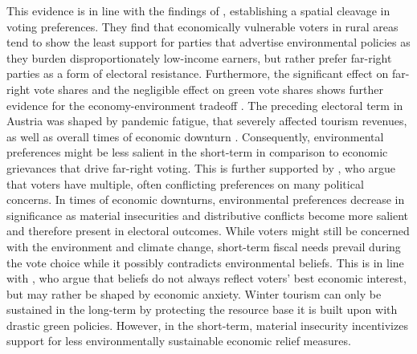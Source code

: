 \documentclass{article}
\begin{document}
This evidence is in line with the findings of \textcite{Halikiopoulou_Vrakopoulos_Arndt_2026}, establishing a spatial cleavage in voting preferences. They find that economically vulnerable voters in rural areas tend to show the least support for parties that advertise  environmental policies as they burden disproportionately low-income earners, but rather prefer far-right parties as a form of electoral resistance. Furthermore, the significant effect on far-right vote shares and the negligible effect on green vote shares shows further evidence for the economy-environment tradeoff \parencite{Shum2012, Mildenberger2017}. The preceding electoral term in Austria was shaped by pandemic fatigue, that severely affected tourism revenues, as well as overall times of economic downturn \parencite{Praprotnik2025}. Consequently,  environmental preferences might be less salient in the short-term in comparison to economic grievances that drive far-right voting. This is further supported by \textcite{Zaller1992}, who argue that voters have multiple, often conflicting preferences on many political concerns. In times of economic downturns, environmental preferences decrease in significance as material insecurities and distributive conflicts become more salient and therefore present in electoral outcomes. While voters might still be concerned with the environment and climate change, short-term fiscal needs prevail during the vote choice while it possibly contradicts environmental beliefs. This is in line with \textcite{Rho2017}, who argue that beliefs do not always reflect voters' best economic interest, but may rather be shaped by economic anxiety. Winter tourism can only be sustained in the long-term by protecting the resource base it is built upon with drastic green policies. However, in the short-term, material insecurity incentivizes support for less environmentally sustainable economic relief measures.  
\end{document}
